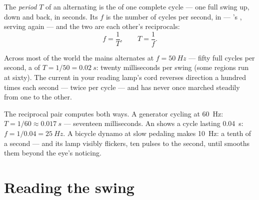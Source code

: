 \begin{definition}\label{def:g9:alternating-current:period}
The \emph{period} $T$ of an alternating 
is the  of one complete cycle --- one full swing up,
down and back, in seconds. Its \emph{} $f$ is the
number of cycles per second, in  --- 's ,
serving again --- and the two are each other's reciprocals:
\[
f = \frac{1}{T}, \qquad T = \frac{1}{f}.
\]
\end{definition}

\begin{proposition}\label{prop:g9:alternating-current:mains}
Across most of the world the mains alternates at
$f = \qty{50}{Hz}$ --- fifty full cycles per second, a 
of $T = 1/50 = \qty{0.02}{s}$: twenty milliseconds per swing
(some regions run at sixty). The current in your reading
lamp's cord reverses direction a hundred times each second
--- twice per cycle --- and has never once marched steadily
from one  to the other.
\end{proposition}

\begin{example}\label{ex:g9:alternating-current:arithmetic}
The reciprocal pair computes both ways. A generator cycling at
\qty{60}{Hz}: $T = 1/60 \approx \qty{0.017}{s}$ --- seventeen
milliseconds. An  shows a cycle lasting
\qty{0.04}{s}: $f = 1/0.04 = \qty{25}{Hz}$. A bicycle dynamo
at slow pedaling makes \qty{10}{Hz}:  a tenth of a
second --- and its lamp visibly flickers, ten pulses to the
second, until  smooths them beyond the eye's noticing.
\end{example}

\section{Reading the swing}

